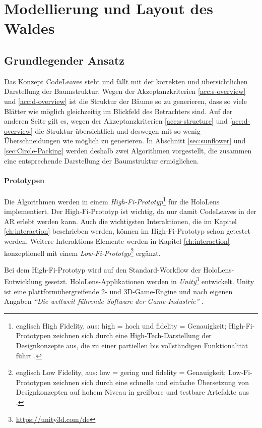 \chapter{Modellierung und Layout des Waldes}
\label{ch:layout}

\section{Grundlegender Ansatz}

Das Konzept CodeLeaves steht und fällt mit der korrekten und übersichtlichen Darstellung der Baumstruktur. Wegen der Akzeptanzkriterien \ref{acc:s-overview} und \ref{acc:d-overview} ist die Struktur der Bäume so zu generieren, dass so viele Blätter wie möglich gleichzeitig im Blickfeld des Betrachters sind. Auf der anderen Seite gilt es, wegen der Akzeptanzkriterien \ref{acc:s-structure} und \ref{acc:d-overview} die Struktur übersichtlich und deswegen mit so wenig Überschneidungen wie möglich zu generieren. In Abschnitt \ref{sec:sunflower} und \ref{sec:Circle-Packing} werden deshalb zwei Algorithmen vorgestellt, die zusammen eine entsprechende Darstellung der Baumstruktur ermöglichen.

\subsubsection*{Prototypen}

Die Algorithmen werden in einem \textit{High-Fi-Prototyp}\footnote{englisch High Fidelity, aus: high = hoch und fidelity = Genauigkeit; High-Fi-Prototypen zeichnen sich durch eine High-Tech-Darstellung der Designkonzepte aus, die zu einer partiellen bis vollständigen Funktionalität führt \cite{egger2000fi}.} für die HoloLens implementiert. Der High-Fi-Prototyp ist wichtig, da nur damit CodeLeaves in der AR erlebt werden kann. Auch die wichtigsten Interaktionen, die im Kapitel \ref{ch:interaction} beschrieben werden, können im High-Fi-Prototyp schon getestet werden. Weitere Interaktions-Elemente werden in Kapitel \ref{ch:interaction} konzeptionell mit einem \textit{Low-Fi-Prototyp}\footnote{englisch Low Fidelity, aus: low = gering und fidelity = Genauigkeit; Low-Fi-Prototypen zeichnen sich durch eine schnelle und einfache Übersetzung von Designkonzepten auf hohem Niveau in greifbare und testbare Artefakte aus \cite{egger2000fi}.}   ergänzt.

Bei dem High-Fi-Prototyp wird auf den Standard-Workflow der HoloLens-Entwicklung gesetzt. HoloLens-Applikationen werden in \textit{Unity}\footnote{\url{https://unity3d.com/de}} entwickelt. Unity ist eine platt\-form\-über\-grei\-fen\-de 2- und 3D-Game-Engine und nach eigenen Angaben \textit{"`Die weltweit führende Software der Game-Industrie"'} \cite{unity2017public}.

